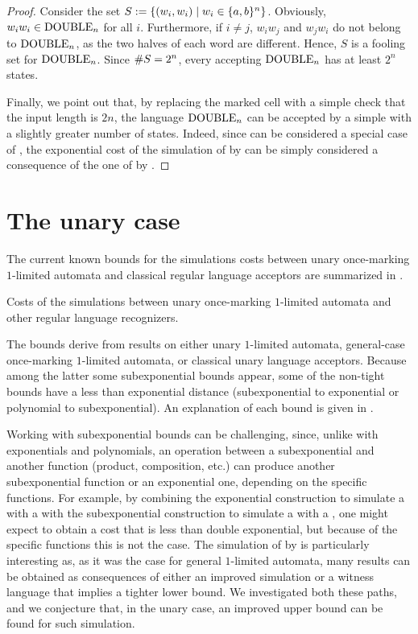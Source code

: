 \begin{proof}
	Consider the set $S:=\{(w_i,w_i)\mid w_i\in\{a,b\}^n\}$.
	Obviously, $w_iw_i\in\mathrm{DOUBLE}_n$ for all $i$.
	Furthermore, if $i\ne j$, $w_iw_j$ and $w_jw_i$ do not belong to $\mathrm{DOUBLE}_n$, as the two halves of each word are different.
	Hence, $S$ is a fooling set for $\mathrm{DOUBLE}_n$.
	Since $\# S=2^n$, every \ONFA accepting $\mathrm{DOUBLE}_n$ has at least $2^n$ states.

	Finally, we point out that, by replacing the marked cell with a simple check that the input length is $2n$, the language $\mathrm{DOUBLE}_n$ can be accepted by a simple \TDFA with a slightly greater number of states.
	Indeed, since \TDFA can be considered a special case of \OMODLA, the exponential cost of the simulation of \OMODLA by \ONFA can be simply considered a consequence of the one of \TDFA by \ONFA.
\end{proof}



\section{The unary case}\label{sec:oncemarking-unary}
The current known bounds for the simulations costs between unary once-marking $1$-limited automata and classical regular language acceptors are summarized in .

\begin{table}
	\caption{Costs of the simulations between unary once-marking $1$-limited automata and other regular language recognizers.}
	\label{tab:sims-om-unary-oncemarking}
\end{table}

The bounds derive from results on either unary $1$-limited automata, general-case once-marking $1$-limited automata, or classical unary language acceptors.
Because among the latter some subexponential bounds appear, some of the non-tight bounds have a less than exponential distance (subexponential to exponential or polynomial to subexponential).
An explanation of each bound is given in .

Working with subexponential bounds can be challenging, since, unlike with exponentials and polynomials, an operation between a subexponential and another function (product, composition, etc.) can produce another subexponential function or an exponential one, depending on the specific functions.
For example, by combining the exponential construction to simulate a \OLA with a \ONFA with the subexponential construction to simulate a \ONFA with a \ODFA, one might expect to obtain a cost that is less than double exponential, but because of the specific functions this is not the case.
The simulation of \OMOLA by \ODFA is particularly interesting as, as it was the case for general $1$-limited automata, many results can be obtained as consequences of either an improved simulation or a witness language that implies a tighter lower bound.
We investigated both these paths, and we conjecture that, in the unary case, an improved upper bound can be found for such simulation.




